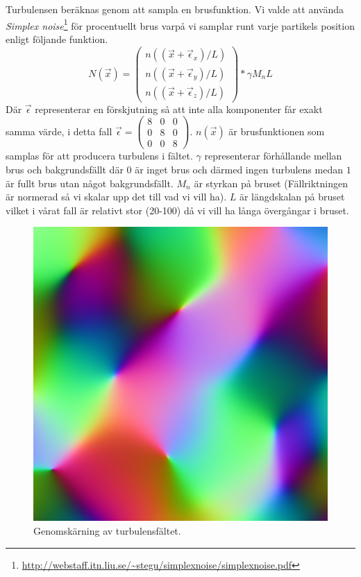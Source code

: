 \documentclass[a4paper]{article}
\begin{document}
\begin{multicols}{2}
    Turbulensen beräknas genom att sampla en brusfunktion. Vi valde att använda \textit{Simplex noise}\footnote{\url{http://webstaff.itn.liu.se/~stegu/simplexnoise/simplexnoise.pdf}} för procentuellt brus varpå vi samplar runt varje partikels position enligt följande funktion.
    \begin{equation}
   N(\vec{x}) =  
        \begin{pmatrix}
        n((\vec{x} + \vec{\epsilon}_x)/L)
        \\
        n((\vec{x} + \vec{\epsilon}_y)/L)
        \\ 
        n((\vec{x} + \vec{\epsilon}_z)/L)
        \end{pmatrix} * \gamma M_nL
    \end{equation}
    Där $\vec{\epsilon}$ representerar en förskjutning så att inte alla komponenter får exakt samma värde, i detta fall $\vec{\epsilon} = \begin{pmatrix}
8 & 0 & 0\\ 
0 & 8 & 0\\ 
0 & 0 & 8
\end{pmatrix}$. $n(\vec{x})$ är brusfunktionen som samplas för att producera turbulens i fältet. $\gamma$ representerar förhållande mellan brus och bakgrundsfällt där $0$ är inget brus och därmed ingen turbulens medan $1$ är fullt brus utan något bakgrundsfällt. $M_n$ är styrkan på bruset (Fällriktningen är normerad så vi skalar upp det till vad vi vill ha). $L$ är längdskalan på bruset vilket i vårat fall är relativt stor (20-100) då vi vill ha långa övergångar i bruset.
\begin{figure}[H]
\center
\begin{minipage}[]{0.3\textwidth}
\includegraphics[width=\textwidth]{share/Noise.png}
\caption{Genomskärning av turbulensfältet.}
\end{minipage}
\end{figure}


\end{multicols}
\end{document}
